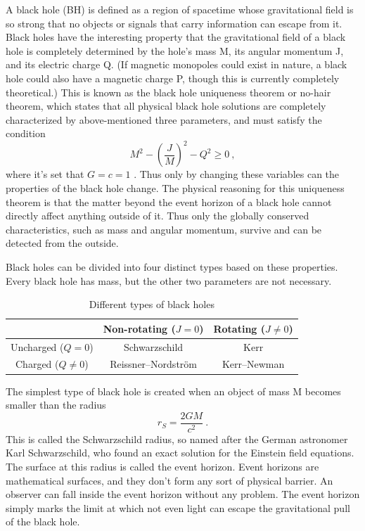 \documentclass[english, oneside]{HYgradu}
\begin{document}
A black hole (BH) is defined as a region of spacetime whose gravitational field is so strong that no objects or signals that carry information can escape from it. Black holes have the interesting property that the gravitational field of a black hole is completely determined by the hole's mass M, its angular momentum J, and its electric charge Q. (If magnetic monopoles could exist in nature, a black hole could also have a magnetic charge P, though this is currently completely theoretical.) This is known as the black hole uniqueness theorem or no-hair theorem, which states that all physical black hole solutions are completely characterized by above-mentioned three parameters, and must satisfy the condition 
\begin{equation} \label{equ:bhunique}
M^2 - \left( \frac{J}{M} \right)^2 - Q^2 \geq 0 \ ,
\end{equation}
where it's set that $G = c = 1$ \citep{mazur:2001}.
Thus only by changing these variables can the properties of the black hole change. The physical reasoning for this uniqueness theorem is that the matter beyond the event horizon of a black hole cannot directly affect anything outside of it. Thus only the globally conserved characteristics, such as mass and angular momentum, survive and can be detected from the outside. 

Black holes can be divided into four distinct types based on these properties. Every black hole has mass, but the other two parameters are not necessary.
\begin{table}[htb]
\centering
\caption{Different types of black holes}
\begin{tabular}{|c|c|c|}
\hline
 & Non-rotating ($J = 0$) & Rotating ($J \neq 0$) \\ \hline
Uncharged ($Q = 0$) & Schwarzschild & Kerr \\ \hline
Charged ($Q \neq 0$) & Reissner–Nordström & Kerr–Newman \\ \hline
\end{tabular}
\end{table}

The simplest type of black hole is created when an object of mass M becomes smaller than the radius
\begin{equation}
r_S = \frac{2GM}{c^2} \ .
\end{equation}
This is called the Schwarzschild radius, so named after the German astronomer Karl Schwarzschild, who found an exact solution for the Einstein field equations. The surface at this radius is called the event horizon. Event horizons are mathematical surfaces, and they don't form any sort of physical barrier. An observer can fall inside the event horizon without any problem. The event horizon simply marks the limit at which not even light can escape the gravitational pull of the black hole.
\end{document}
